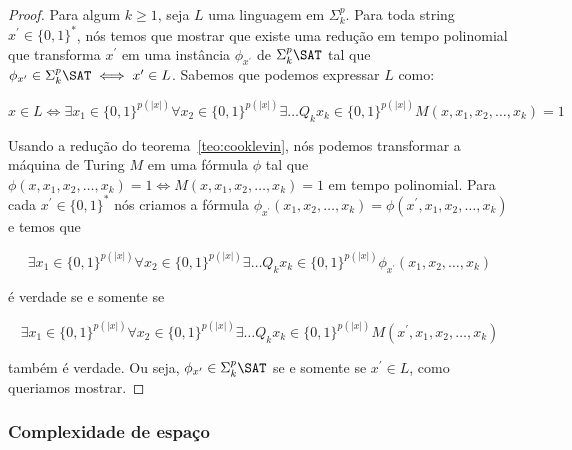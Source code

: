 \begin{proof}

Para algum $k \geq 1$, seja $L$ uma linguagem em $\Sigma_{k}^{p}$. Para toda string $x^{\prime} \in \{0, 1\}^{*}$, nós temos que mostrar que existe uma redução em tempo polinomial que transforma $x^{\prime}$ em uma instância $\phi_{x^{\prime}}$ de $\Sigma_{k}^{p}\SAT$ tal que $\phi_{x^{\prime}} \in \Sigma_{k}^{p}\SAT \iff x^{\prime} \in L$. Sabemos que podemos expressar $L$ como:

\begin{equation*}
    x \in L \iff \exists x_{1} \in \{0, 1\}^{p(\lvert x \rvert)} \forall x_{2} \in \{0, 1\}^{p(\lvert x \rvert)} \exists \dots Q_{k} x_{k} \in \{0, 1\}^{p(\lvert x \rvert)} M(x, x_{1}, x_{2}, \dots, x_{k}) = 1
\end{equation*}

Usando a redução do teorema~\ref{teo:cooklevin}, nós podemos transformar a máquina de Turing $M$ em uma fórmula $\phi$ tal que $\phi(x, x_{1}, x_{2}, \dots, x_{k}) = 1 \iff M(x, x_{1}, x_{2}, \dots, x_{k}) = 1$ em tempo polinomial. Para cada $x^{\prime} \in \{0, 1\}^{*}$ nós criamos a fórmula $\phi_{x^{\prime}}(x_{1}, x_{2}, \dots, x_{k}) = \phi(x^{\prime}, x_{1}, x_{2}, \dots, x_{k})$ e temos que

\begin{equation*}
    \exists x_{1} \in \{0, 1\}^{p(\lvert x \rvert)} \forall x_{2} \in \{0, 1\}^{p(\lvert x \rvert)} \exists \dots Q_{k} x_{k} \in \{0, 1\}^{p(\lvert x \rvert)} \phi_{x^{\prime}}(x_{1}, x_{2}, \dots, x_{k})
\end{equation*}

é verdade se e somente se

\begin{equation*}
     \exists x_{1} \in \{0, 1\}^{p(\lvert x \rvert)} \forall x_{2} \in \{0, 1\}^{p(\lvert x \rvert)} \exists \dots Q_{k} x_{k} \in \{0, 1\}^{p(\lvert x \rvert)} M(x^{\prime}, x_{1}, x_{2}, \dots, x_{k})
\end{equation*}

também é verdade. Ou seja, $\phi_{x^{\prime}} \in \Sigma_{k}^{p}\SAT$ se e somente se $x^{\prime} \in L$, como queriamos mostrar.

\end{proof}

\subsubsection{Complexidade de espaço}

